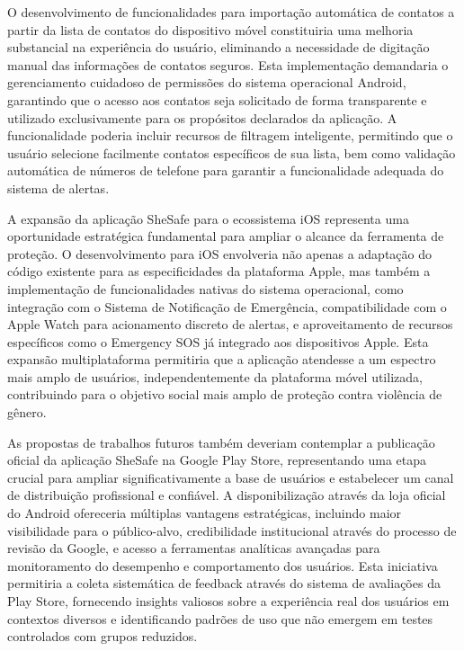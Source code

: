 O desenvolvimento de funcionalidades para importação automática de contatos a partir da lista de contatos do dispositivo móvel constituiria uma melhoria substancial na experiência do usuário, eliminando a necessidade de digitação manual das informações de contatos seguros. Esta implementação demandaria o gerenciamento cuidadoso de permissões do sistema operacional Android, garantindo que o acesso aos contatos seja solicitado de forma transparente e utilizado exclusivamente para os propósitos declarados da aplicação. A funcionalidade poderia incluir recursos de filtragem inteligente, permitindo que o usuário selecione facilmente contatos específicos de sua lista, bem como validação automática de números de telefone para garantir a funcionalidade adequada do sistema de alertas.

A expansão da aplicação SheSafe para o ecossistema iOS representa uma oportunidade estratégica fundamental para ampliar o alcance da ferramenta de proteção. O desenvolvimento para iOS envolveria não apenas a adaptação do código existente para as especificidades da plataforma Apple, mas também a implementação de funcionalidades nativas do sistema operacional, como integração com o Sistema de Notificação de Emergência, compatibilidade com o Apple Watch para acionamento discreto de alertas, e aproveitamento de recursos específicos como o Emergency SOS já integrado aos dispositivos Apple. Esta expansão multiplataforma permitiria que a aplicação atendesse a um espectro mais amplo de usuários, independentemente da plataforma móvel utilizada, contribuindo para o objetivo social mais amplo de proteção contra violência de gênero.

As propostas de trabalhos futuros também deveriam contemplar a publicação oficial da aplicação SheSafe na Google Play Store, representando uma etapa crucial para ampliar significativamente a base de usuários e estabelecer um canal de distribuição profissional e confiável. A disponibilização através da loja oficial do Android ofereceria múltiplas vantagens estratégicas, incluindo maior visibilidade para o público-alvo, credibilidade institucional através do processo de revisão da Google, e acesso a ferramentas analíticas avançadas para monitoramento do desempenho e comportamento dos usuários. Esta iniciativa permitiria a coleta sistemática de feedback através do sistema de avaliações da Play Store, fornecendo insights valiosos sobre a experiência real dos usuários em contextos diversos e identificando padrões de uso que não emergem em testes controlados com grupos reduzidos.

